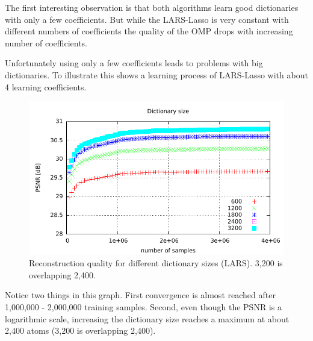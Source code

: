 
The first interesting observation is that both algorithms learn good
dictionaries with only a few coefficients. But while the LARS-Lasso is very
constant with different numbers of coefficients the quality of the OMP drops
with increasing number of coefficients. 

Unfortunately using only a few coefficients leads to problems with big
dictionaries. To illustrate this  shows a
learning process of LARS-Lasso with about 4 learning coefficients.
\begin{figure}[h]
\centering
\includegraphics[width = 1.0\textwidth]{../tests/results/dictSizeLasso.pdf}
\caption[Reconstruction quality for different dictionary sizes
(LARS)]{Reconstruction quality for different dictionary sizes (LARS). 3,200 is
overlapping 2,400.}
\label{fig:dictSizeLassoBad}
\end{figure}
Notice two things in this graph. First convergence is almost reached
after 1,000,000 - 2,000,000 training samples. Second, even though the PSNR is a
logarithmic scale, increasing the dictionary size reaches a maximum at
about 2,400 atoms (3,200 is overlapping 2,400). 

